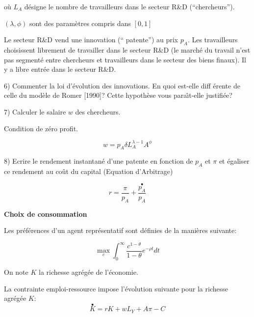 \documentclass[a4paper]{article}
\begin{document}
o\`{u} $L_{A}$ d\'{e}signe le nombre de travailleurs dans le secteur R\&D
(\textquotedblleft chercheurs\textquotedblright ).

$\left( \lambda ,\phi \right) $ sont des param\`{e}tres compris dans $\left[
0,1\right] $

\bigskip

Le secteur R\&D vend une innovation (\textquotedblleft
patente\textquotedblright ) au prix $p_{A}$. Les travailleurs choisissent
librement de travailler dans le secteur R\&D (le march\'{e} du travail n'est
pas segment\'{e} entre chercheurs et travailleurs dans le secteur des biens
finaux). Il y a libre entr\'{e}e dans le secteur R\&D.

\bigskip

6) Commenter la loi d'\'{e}volution des innovations. En quoi est-elle diff%
\'{e}rente de celle du mod\`{e}le de Romer [1990]? Cette hypoth\`{e}se vous
para\^{\i}t-elle justifi\'{e}e?

\bigskip

7) Calculer le salaire $w$ des chercheurs.

Condition de z\'{e}ro profit.

\begin{equation*}
w=p_{A}\delta L_{A}^{\lambda -1}A^{\phi }
\end{equation*}

8) Ecrire le rendement instantan\'{e} d'une patente en fonction de $p_{A}$
et $\pi $ et \'{e}galiser ce rendement au co\^{u}t du capital (Equation
d'Arbitrage)

\begin{equation*}
r=\frac{\pi }{p_{A}}+\frac{\overset{\bullet }{p_{A}}}{p_{A}}
\end{equation*}

\bigskip \pagebreak

\textbf{Choix de consommation}

\bigskip

Les pr\'{e}f\'{e}rences d'un agent repr\'{e}sentatif sont d\'{e}finies de la
mani\`{e}res suivante:

\begin{equation*}
\max_{c}\int_{0}^{\infty }\frac{c^{1-\theta }}{1-\theta }e^{-\rho t}dt
\end{equation*}

On note $K$ la richesse agr\'{e}g\'{e}e de l'\'{e}conomie.

La contrainte emploi-ressource impose l'\'{e}volution suivante pour la
richesse agr\'{e}g\'{e}e $K$:%
\begin{equation*}
\overset{\bullet }{K}=rK+wL_{Y}+A\pi -C
\end{equation*}
\end{document}
